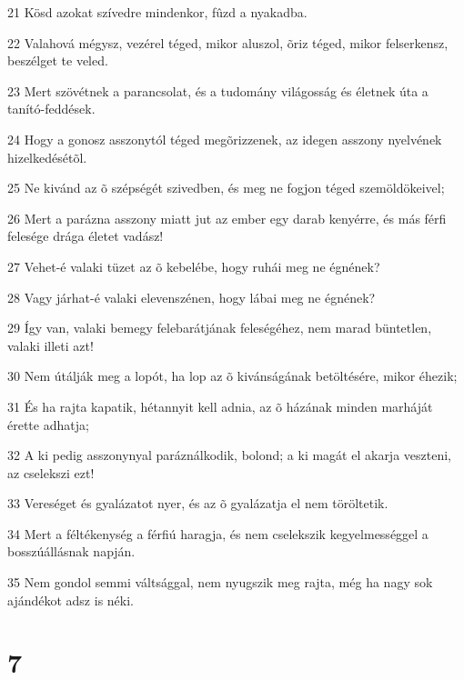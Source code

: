 \par 21 Kösd azokat szívedre mindenkor, fûzd a nyakadba.
\par 22 Valahová mégysz, vezérel téged, mikor aluszol, õriz téged, mikor felserkensz, beszélget te veled.
\par 23 Mert szövétnek a parancsolat, és a tudomány világosság és életnek úta a tanító-feddések.
\par 24 Hogy a gonosz asszonytól téged megõrizzenek, az idegen asszony nyelvének hizelkedésétõl.
\par 25 Ne kivánd az õ szépségét szivedben, és meg ne fogjon téged szemöldökeivel;
\par 26 Mert a parázna asszony miatt jut az ember egy darab kenyérre, és más férfi felesége drága életet vadász!
\par 27 Vehet-é valaki tüzet az õ kebelébe, hogy ruhái meg ne égnének?
\par 28 Vagy járhat-é valaki elevenszénen, hogy lábai meg ne égnének?
\par 29 Így van, valaki bemegy felebarátjának feleségéhez, nem marad büntetlen, valaki illeti azt!
\par 30 Nem útálják meg a lopót, ha lop az õ kivánságának betöltésére, mikor éhezik;
\par 31 És ha rajta kapatik, hétannyit kell adnia, az õ házának minden marháját érette adhatja;
\par 32 A ki pedig asszonynyal paráználkodik, bolond; a ki magát el akarja veszteni, az cselekszi ezt!
\par 33 Vereséget és gyalázatot nyer, és az õ gyalázatja el nem töröltetik.
\par 34 Mert a féltékenység a férfiú haragja, és nem cselekszik kegyelmességgel a bosszúállásnak napján.
\par 35 Nem gondol semmi váltsággal, nem nyugszik meg rajta, még ha nagy sok ajándékot adsz is néki.

\chapter{7}

